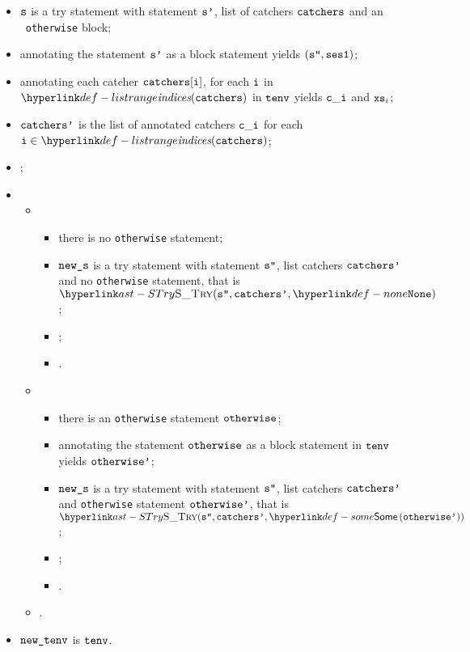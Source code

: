 \ProseParagraph
\AllApply
\begin{itemize}
  \item $\texttt{s}$ is a try statement with statement $\texttt{s'}$, list of catchers $\texttt{catchers}$ and an \optionalterm\ \texttt{otherwise} block;
  \item annotating the statement $\texttt{s'}$ as a block statement yields $(\texttt{s''}, \texttt{ses1})$\ProseOrTypeError;
  \item annotating each catcher $\texttt{catchers}[\texttt{i}]$, for each $\texttt{i}$ in $\listrange(\catchers)$ in $\texttt{tenv}$ yields $\texttt{c}\_\texttt{i}$
        and $\texttt{xs}_i$\ProseOrTypeError;
  \item $\texttt{catchers'}$ is the list of annotated catchers $\texttt{c}\_\texttt{i}$ for each $\vi\in\listrange(\catchers)$;
  \item {};
  \item \OneApplies
  \begin{itemize}
    \item {}
    \begin{itemize}
      \item there is no \texttt{otherwise} statement;
      \item $\texttt{new\_s}$ is a try statement with statement $\texttt{s''}$, list catchers $\texttt{catchers'}$ and no \texttt{otherwise} statement,
            that is \\
            $\STry(\vspp, \catchersp, \None)$;
      \item {};
      \item \Proseeqdef{$\vsesthree$}{$\vsestwo$}.
    \end{itemize}

    \item {}
    \begin{itemize}
      \item there is an \texttt{otherwise} statement $\texttt{otherwise}$;
      \item annotating the statement $\texttt{otherwise}$ as a block statement in $\texttt{tenv}$ yields $\texttt{otherwise'}$\ProseOrTypeError;
      \item $\texttt{new\_s}$ is a try statement with statement $\texttt{s''}$, list catchers $\texttt{catchers'}$ and \texttt{otherwise} statement
            $\texttt{otherwise'}$, that is \\
            $\STry(\vspp, \catchersp, \some{\otherwisep})$;
      \item \Proseeqdef{$\vsesotherwise$}{$\vsesblock$};
      \item \Proseeqdef{$\vsesthree$}{$\vsestwo$}.
    \end{itemize}

    \item {}.
  \end{itemize}
  \item $\texttt{new\_tenv}$ is $\texttt{tenv}$.
\end{itemize}

